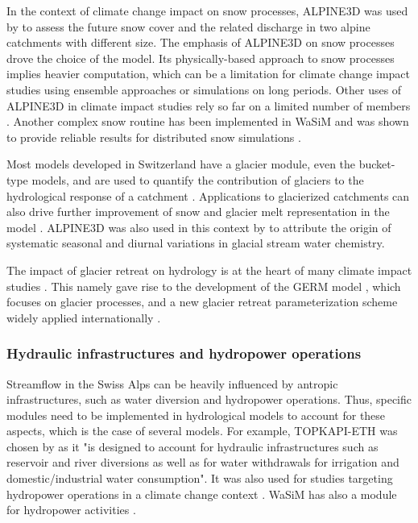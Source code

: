 \documentclass[10pt,a4paper]{article}
\begin{document}
In the context of climate change impact on snow processes, ALPINE3D was used by \citet{Bavay2009} to assess the future snow cover and the related discharge in two alpine catchments with different size. The emphasis of ALPINE3D on snow processes drove the choice of the model. Its physically-based approach to snow processes implies heavier computation, which can be a limitation for climate change impact studies using ensemble approaches or simulations on long periods. Other uses of ALPINE3D in climate impact studies rely so far on a limited number of members \citep[climate scenarios or climate model chains;][]{Bavay2013, Marty2017}. Another complex snow routine has been implemented in WaSiM and was shown to provide reliable results for distributed snow simulations \citep{Thornton2021}. 

Most models developed in Switzerland have a glacier module, even the bucket-type models, and are used to quantify the contribution of glaciers to the hydrological response of a catchment \citep[see for example][]{Verbunt2003, Zappa2007a, Uhlmann2013a}. Applications to glacierized catchments can also drive further improvement of snow and glacier melt representation in the model \citep{Finger2011}. ALPINE3D was also used in this context by \citet{Hindshaw2011} to attribute the origin of systematic seasonal and diurnal variations in glacial stream water chemistry.

The impact of glacier retreat on hydrology is at the heart of many climate impact studies \citep{Horton2006, Schaefli2007b, Junghans2011, Addor2014, Finger2015, Etter2017}. This namely gave rise to the development of the GERM model \citep{Huss2016, Junghans2011, Farinotti2012, Finger2013}, which focuses on glacier processes, and a new glacier retreat parameterization scheme widely applied internationally \citep{Huss2010}.



\subsubsection{Hydraulic infrastructures and hydropower operations}
\label{sec:application:infrastructures}

Streamflow in the Swiss Alps can be heavily influenced by antropic infrastructures, such as water diversion and hydropower operations. Thus, specific modules need to be implemented in hydrological models to account for these aspects, which is the case of several models. For example, TOPKAPI-ETH was chosen by \citet{Fatichi2014} as it "is designed to account for hydraulic infrastructures such as reservoir and river diversions as well as for water withdrawals for irrigation and domestic/industrial water consumption". It was also used for studies targeting hydropower operations in a climate change context \citep{Fatichi2015b, Anghileri2018}. WaSiM has also a module for hydropower activities \citep{Verbunt2005}.
\end{document}
